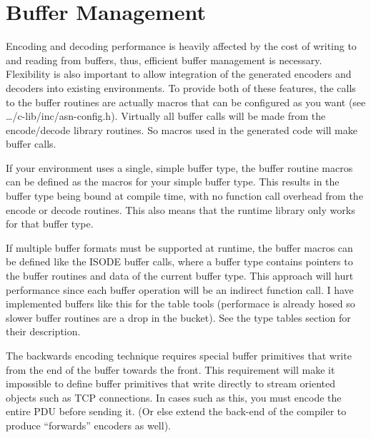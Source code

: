 \section{\label{lib-buf-section}Buffer Management}

Encoding and decoding performance is heavily affected by the cost of
writing to and reading from buffers, thus, efficient buffer management
is necessary.  Flexibility is also important to allow integration of
the generated encoders and decoders into existing environments.  To
provide both of these features, the calls to the buffer routines are
actually macros that can be configured as you want (see
{\ufn \dots/c-lib/inc/asn-config.h}). Virtually all buffer calls will
be made from the encode/decode library routines.  So macros used in
the generated code will make buffer calls.

If your environment uses a single, simple buffer type, the buffer
routine macros can be defined as the macros for your simple buffer type.
This results in the buffer type being bound at compile time, with no
function call overhead from the encode or decode routines.  This also
means that the runtime library only works for that buffer type.

If multiple buffer formats must be supported at runtime, the buffer
macros can be defined like the ISODE buffer calls, where a buffer type
contains pointers to the buffer routines and data of the current
buffer type.  This approach will hurt performance since each buffer
operation will be an indirect function call.  I have implemented
buffers like this for the table tools (performace is already hosed so
slower buffer routines are a drop in the bucket).  See the type tables
section for their description.

The backwards encoding technique requires special buffer primitives
that write from the end of the buffer towards the front.  This
requirement will make it impossible to define buffer primitives that
write directly to stream oriented objects such as TCP connections.  In
cases such as this, you must encode the entire PDU before sending it.
(Or else extend the back-end of the compiler to produce ``forwards''
encoders as well).

